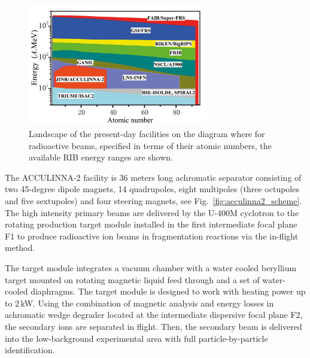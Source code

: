\begin{figure}[t]
	\begin{center}
		\includegraphics[width=0.7\textwidth]{figures/acculinna2_part.png}
	\end{center}
	\caption{
		Landscape of the present-day facilities on the diagram where for radioactive beams, specified in terms of their atomic numbers, the available RIB energy ranges are shown.}
	\label{fig:acculinna2_worldplace}
\end{figure}

The ACCULINNA-2 facility is 36 meters long achromatic separator consisting of two 45-degree dipole magnets, 14 quadrupoles, eight multipoles (three octupoles and five sextupoles) and four steering magnets, see Fig.\ \ref{fig:acculinna2_scheme}.
The high intensity primary beams are delivered by the U-400M cyclotron to the rotating production target module installed in the first intermediate focal plane F1 to produce radioactive ion beams in fragmentation reactions via the in-flight method.

The target module integrates a vacuum chamber with a water cooled beryllium target mounted on rotating magnetic liquid feed through and a set of water-cooled diaphragms. 
The target module is designed to work with heating power up to 2\,kW. 
Using the combination of magnetic analysis and energy losses in achromatic wedge degrader located at the intermediate dispersive focal plane F2, the secondary ions are separated in flight. 
Then, the secondary beam is delivered into the low-background experimental area with full particle-by-particle identification.

